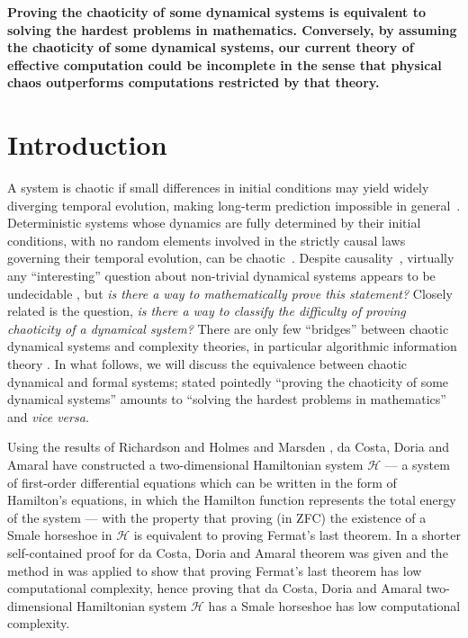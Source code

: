 \documentclass[
aip,
cha,
amssymb
]{revtex4-1}
\begin{document}
{\bf
Proving the chaoticity of some dynamical systems is equivalent to solving the hardest problems in mathematics.
Conversely, by assuming the chaoticity of some dynamical systems, our current theory of effective computation could be incomplete
in the sense that physical chaos outperforms computations restricted by that theory.}

\section{Introduction}


A system is chaotic if small differences in initial conditions may yield widely diverging temporal evolution, making long-term prediction impossible in general~\cite{Campbell-1882,poincare14}.
Deterministic systems whose dynamics are fully determined by their initial conditions,
with no random elements involved in the strictly causal laws governing their temporal evolution,
can be chaotic~\cite{kellert-93,Devaney-1989}.
Despite causality~\cite{suppes-1993}, virtually any ``interesting'' question about non-trivial dynamical systems appears to be
undecidable \cite{Stewart-91}, but {\it is there a way to mathematically prove this statement?}
Closely related is the question, {\it is there a way to classify the difficulty of proving chaoticity of a dynamical system?}
There are only few ``bridges'' between chaotic dynamical systems and
complexity theories, in particular algorithmic information theory \cite{gacs09}.
In what follows, we will discuss the equivalence between chaotic dynamical and formal systems;
stated pointedly  ``proving the chaoticity of some dynamical systems''
amounts to ``solving the hardest problems in mathematics'' and {\it vice versa.}

Using the results of Richardson \cite{richardson68} and
Holmes and  Marsden \cite{Homes-Marsden-82},
da Costa,  Doria  and Amaral \cite{dc-d93} have constructed a two-dimensional Hamiltonian system $\mathcal{H}$
--- a system of first-order differential equations which can be written in the form of Hamilton's equations,
in which the Hamilton function represents the total energy of the system ---
with the property that proving (in ZFC)
the existence of a Smale horseshoe in $\mathcal{H}$ is equivalent to proving Fermat's last theorem. In  \cite{ecalude-10}
a shorter self-contained proof for da Costa,  Doria  and Amaral theorem was given and the  method  in  \cite{calude-elena-dinneen06,calude-elena-ec1,calude-elena-ec2}
was applied to show that proving Fermat's last theorem has low computational complexity, hence proving that
 da Costa,  Doria  and Amaral two-dimensional Hamiltonian system $\mathcal{H}$ has a Smale horseshoe has low computational complexity.
\end{document}
